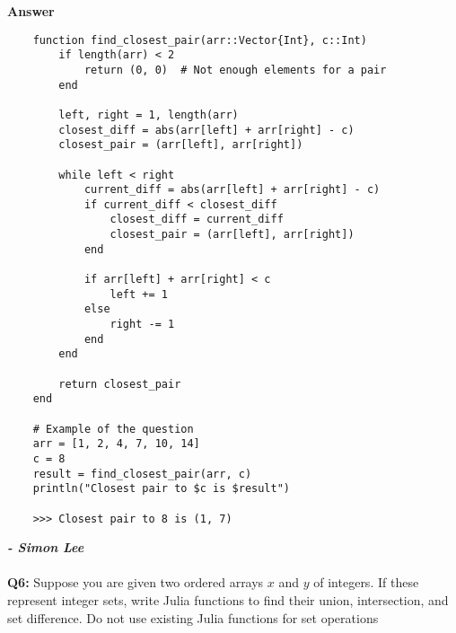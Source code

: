 \documentclass[8pt]{article}
\begin{document}
\textbf{Answer}

\begin{verbatim}
    function find_closest_pair(arr::Vector{Int}, c::Int)
        if length(arr) < 2
            return (0, 0)  # Not enough elements for a pair
        end
        
        left, right = 1, length(arr)
        closest_diff = abs(arr[left] + arr[right] - c)
        closest_pair = (arr[left], arr[right])
        
        while left < right
            current_diff = abs(arr[left] + arr[right] - c)
            if current_diff < closest_diff
                closest_diff = current_diff
                closest_pair = (arr[left], arr[right])
            end
            
            if arr[left] + arr[right] < c
                left += 1
            else
                right -= 1
            end
        end
        
        return closest_pair
    end
    
    # Example of the question
    arr = [1, 2, 4, 7, 10, 14]
    c = 8
    result = find_closest_pair(arr, c)
    println("Closest pair to $c is $result")

    >>> Closest pair to 8 is (1, 7)
\end{verbatim}

\textbf{\textit{- Simon Lee }} \\\\

\textbf{Q6:} Suppose you are given two ordered arrays $x$ and $y$ of integers. If these represent integer sets, write Julia functions to find their union, intersection, and set difference. Do not use existing Julia functions for set operations 
\end{document}
